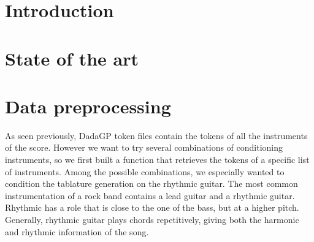 \documentclass[11pt, a4paper]{article}
\begin{document}






\newpage

\section{Introduction}



\section{State of the art}



\section{Data preprocessing}
As seen previously, DadaGP token files contain the tokens of all the instruments of the score.
However we want to try several combinations of conditioning instruments, so we first built a function that retrieves the tokens of a specific list of instruments.
Among the possible combinations, we especially wanted to condition the tablature generation on the rhythmic guitar.
The most common instrumentation of a rock band contains a lead guitar and a rhythmic guitar\cite{regnier_identification_2021}.
Rhythmic has a role that is close to the one of the bass, but at a higher pitch.
Generally, rhythmic guitar plays chords repetitively, giving both the harmonic and rhythmic information of the song.
\end{document}
